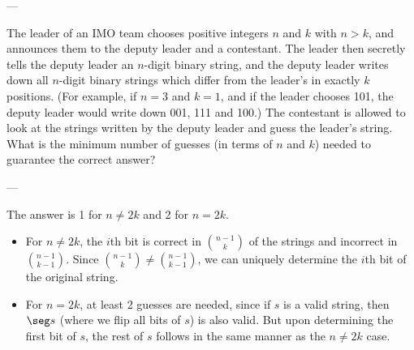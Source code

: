 
---

The leader of an IMO team chooses positive integers $n$ and $k$ with $n>k$, and announces them to the deputy leader and a contestant. The leader then secretly tells the deputy leader an $n$-digit binary string, and the deputy leader writes down all $n$-digit binary strings which differ from the leader’s in exactly $k$ positions. (For example, if $n=3$ and $k=1$, and if the leader chooses 101, the deputy leader would write down 001, 111 and 100.) The contestant is allowed to look at the strings written by the deputy leader and guess the leader’s string. What is the minimum number of guesses (in terms of $n$ and $k$) needed to guarantee the correct answer?

---

The answer is 1 for $n\ne2k$ and 2 for $n=2k$.
\begin{itemize}
    \item For $n\ne2k$, the $i$th bit is correct in $\binom{n-1}k$ of the strings and incorrect in $\binom{n-1}{k-1}$. Since $\binom{n-1}k\ne\binom{n-1}{k-1}$, we can uniquely determine the $i$th bit of the original string.
    \item For $n=2k$, at least 2 guesses are needed, since if $s$ is a valid string, then $\seg s$ (where we flip all bits of $s$) is also valid. But upon determining the first bit of $s$, the rest of $s$ follows in the same manner as the $n\ne2k$ case.
\end{itemize}

